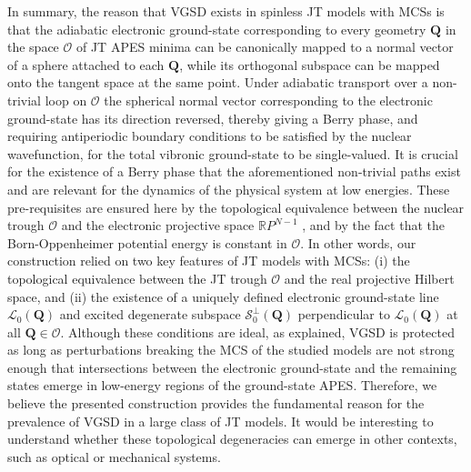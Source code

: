 \documentclass[superscriptaddress,showpacs,amsmath,amssymb,pra,twocolumn]{revtex4-1}
\begin{document}
In summary, the reason that VGSD exists in spinless JT models with
MCSs is that the adiabatic electronic ground-state corresponding to
every geometry $\mathbf{Q}$ in the space $\mathcal{O}$ of JT APES
minima can be canonically mapped to a normal vector of a sphere attached
to each $\mathbf{Q}$, while its orthogonal subspace can be mapped
onto the tangent space at the same point. Under adiabatic transport
over a non-trivial loop on $\mathcal{O}$ the spherical normal vector
corresponding to the electronic ground-state has its direction reversed,
thereby giving a Berry phase, and requiring antiperiodic boundary
conditions to be satisfied by the nuclear wavefunction, for the total
vibronic ground-state to be single-valued. It is crucial for the existence
of a Berry phase that the aforementioned non-trivial paths exist and
are relevant for the dynamics of the physical system at low energies.
These pre-requisites are ensured here by the topological equivalence
between the nuclear trough $\mathcal{O}$ and the electronic projective
space $\mathbb{R}P^{N-1}$ \cite{ceulemans_a._structure_1987,ribeiro_continuous_2017},
and by the fact that the Born-Oppenheimer potential energy is constant
in $\mathcal{O}$. In other words, our construction relied on two
key features of JT models with MCSs: (i) the topological equivalence
between the JT trough $\mathcal{O}$ and the real projective Hilbert
space, and (ii) the existence of a uniquely defined electronic ground-state
line $\mathcal{L}_{0}(\mathbf{Q})$ and excited degenerate subspace
$\mathcal{S}_{0}^{\perp}(\mathbf{Q})$ perpendicular to $\mathcal{L}_{0}(\mathbf{Q})$
at all $\mathbf{Q}\in\mathcal{O}$. Although these conditions are
ideal, as explained, VGSD is protected as long as perturbations breaking
the MCS of the studied models are not strong enough that intersections
between the electronic ground-state and the remaining states emerge
in low-energy regions of the ground-state APES. Therefore, we believe
the presented construction provides the fundamental reason for the
prevalence of VGSD in a large class of JT models. It would be interesting
to understand whether these topological degeneracies can emerge in
other contexts, such as optical or mechanical systems.
\end{document}
